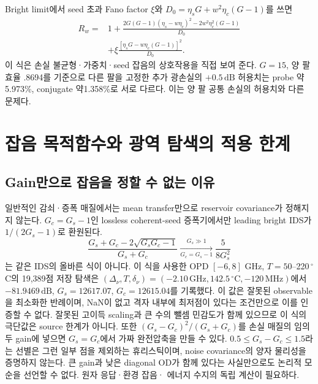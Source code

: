 \documentclass[11pt,a4paper]{article}
\newcommand{\dB}{\,\mathrm{dB}}
\begin{document}
Bright limit에서 seed 초과 Fano factor $\xi$와
$D_0=\eta_sG+w^2\eta_c(G-1)$를 쓰면
\begin{align}
 R_w={}&1+\frac{2G(G-1)(\eta_s-w\eta_c)^2
                    -2w^2\eta_c^2(G-1)}{D_0}\\
 &+\xi\frac{[\eta_sG-w\eta_c(G-1)]^2}{D_0}.
\end{align}
이 식은 손실 불균형·가중치·seed 잡음의 상호작용을 직접 보여 준다.
$G=15$, 양 팔 효율 .8694를 기준으로 다른 팔을 고정한 추가 광손실의
$+0.5\dB$ 허용치는 probe 약5.973\%, conjugate 약1.358\%로 서로 다르다.
이는 양 팔 공통 손실의 허용치와 다른 문제다.

\section{잡음 목적함수와 광역 탐색의 적용 한계}
\subsection{Gain만으로 잡음을 정할 수 없는 이유}
일반적인 감쇠·증폭 매질에서는 mean transfer만으로 reservoir covariance가
정해지지 않는다. $G_c=G_s-1$인 lossless coherent-seed 증폭기에서만
leading bright IDS가 $1/(2G_s-1)$로 환원된다.
\begin{equation}
 \frac{G_s+G_c-2\sqrt{G_sG_c-1}}{G_s+G_c}
 \xrightarrow[G_c=G_s-1]{G_s\gg1}\frac{5}{8G_s^2}
\end{equation}
는 같은 IDS의 올바른 식이 아니다. 이 식을 사용한
OPD $[-6,8]$ GHz, $T=50$--220\,$^\circ$C의 19,389점 저장 탐색은
$(\Delta_\nu,T,\delta_\nu)=(-2.10\,\mathrm{GHz},142.5\,^{\circ}\mathrm C,-120\,\mathrm{MHz})$에서
$-81.9469\dB$, $G_s=12617.07$, $G_c=12615.04$를 기록했다.
이 값은 잘못된 observable을 최소화한 반례이며, NaN이 없고 격자
내부에 최저점이 있다는 조건만으로 이를 인증할 수 없다.
잘못된 고이득 scaling과 큰 수의
뺄셈 민감도가 함께 있으므로 이 식의 극단값은 source 한계가 아니다.
또한 $(G_s-G_c)^2/(G_s+G_c)$를 손실 매질의 임의 두 gain에 넣으면
$G_s=G_c$에서 가짜 완전압축을 만들 수 있다. $0.5\leq G_s-G_c\leq1.5$라는
선별은 그런 일부 점을 제외하는 휴리스틱이며, noise covariance의 양자
물리성을 증명하지 않는다. 큰 gain과 낮은 diagonal OD가 함께 있다는
사실만으로도 논리적 모순을 선언할 수 없다. 원자 응답·환경 잡음·
에너지 수지의 독립 계산이 필요하다.
\end{document}
